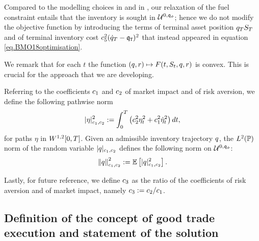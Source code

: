 \documentclass[10pt,a4paper]{article}
\begin{document}
Compared to the modelling choices in \cite{LN19inc} and in \cite{BMO18opt}, our relaxation of the fuel constraint entails that the inventory is sought in $\spaceUnbiasedInventoryTrajectoriesInitialConstraint$; hence we do not modify the objective function by introducing the terms of terminal asset position $\inventory_\timeHorizon \fundamentalPrice_\timeHorizon$ and of terminal inventory cost $\coeffPenalisationOutstandingInventory \squared (\inventoryRate_\timeHorizon - \liquidationTarget)\squared$ that instead appeared in equation \eqref{eq.BMO18optimisation}.

We remark that for each $t$ the function $(\inventory,r)\mapsto F(t,\fundamentalPrice_t, \inventory,r)$ is convex. This is crucial for the approach that we are developing. 

Referring to the coefficients $\coeffMarketImpact$ and $\coeffRiskAversion$ of market impact and of risk aversion, we define the following pathwise norm
\begin{equation}\label{eq.pathwiseSobolevNormIC}
\lvert \eta \rvert_{\coeffMarketImpact,\coeffRiskAversion}\squared := \intZeroTimeHorizon \left( \coeffRiskAversion\squared \eta_t \squared + \coeffMarketImpact\squared \dotEta_t\squared \right)dt,
\end{equation}
for paths $\eta$ in $\sobolevSpaceOneTwo\timeWindow$. Given an admissible inventory trajectory $\inventory$, the $\Ltwo(\Prob)$ norm of the random variable $\lvert \inventory \rvert_{\coeffMarketImpact,\coeffRiskAversion}$ defines the following norm on $\spaceUnbiasedInventoryTrajectoriesInitialConstraint$: 
\begin{equation}\label{eq.sobolevNormOfInventoryTrajectoryIC}
\norm[\inventory]_{\coeffMarketImpact,\coeffRiskAversion}\squared: = \Expectation\left[\lvert \inventory \rvert_{\coeffMarketImpact,\coeffRiskAversion}\squared \right].
\end{equation}

Lastly, for future reference, we define $\ratioAversionOverImpact$ as the ratio of the coefficients of risk aversion and of market impact, namely $\ratioAversionOverImpact := \coeffRiskAversion/\coeffMarketImpact$. 

\subsection{Definition of the concept of good trade execution and statement of the solution}\label{sec.statementOfGoodTradeExecutionIC}
\end{document}
